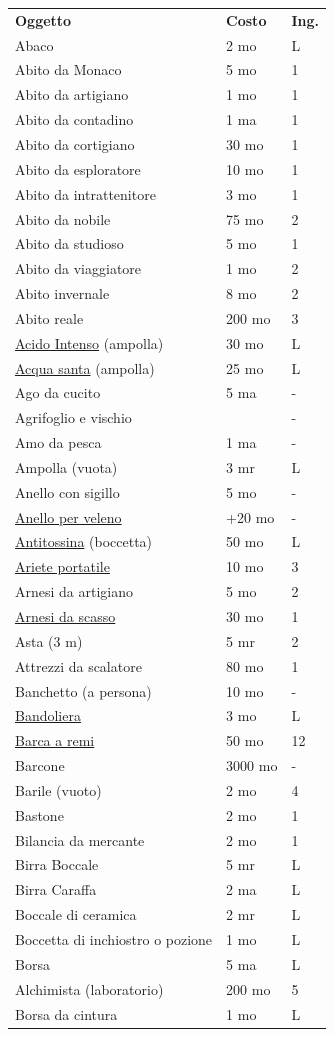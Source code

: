 \begin{multicols}{2}
\noindent\begin{tabularx}{\linewidth}{lll}\label{equipaggiamentolista}
\textbf{Oggetto}& \textbf{Costo} & \textbf{Ing.}\\
Abaco&2 mo&L\\
Abito da Monaco & 5 mo& 1\\
Abito da artigiano& 1 mo& 1\\
Abito da contadino& 1 ma& 1\\
Abito da cortigiano& 30 mo& 1\\
Abito da esploratore& 10 mo& 1\\
Abito da intrattenitore & 3 mo& 1\\
Abito da nobile & 75 mo& 2\\
Abito da studioso & 5 mo& 1\\
Abito da viaggiatore& 1 mo& 2\\
Abito invernale & 8 mo& 2\\
Abito reale & 200 mo & 3\\
\hyperlink{Acido Intenso}{Acido Intenso} (ampolla) & 30 mo& L \\
\hyperlink{Acqua santa}{Acqua santa} (ampolla) & 25 mo& L\\
Ago da cucito & 5 ma &- \\
Agrifoglio e vischio & & -\\
Amo da pesca & 1 ma & - \\
Ampolla (vuota) & 3 mr & L \\
Anello con sigillo& 5 mo& - \\
\hyperlink{Anello per veleno}{Anello per veleno} & +20 mo&-\\
\hyperlink{Antitossina}{Antitossina} (boccetta)& 50 mo& L\\
\hyperlink{Ariete portatile}{Ariete portatile}& 10 mo& 3 \\
Arnesi da artigiano& 5 mo& 2\\
\hyperlink{Attrezzi da scasso}{Arnesi da scasso}& 30 mo& 1\\
Asta (3 m)& 5 mr& 2\\
Attrezzi da scalatore & 80 mo& 1\\
Banchetto (a persona) & 10 mo& -\\
\hyperlink{Bandoliera}{Bandoliera} & 3 mo & L\\
\hyperlink{Barca a remi}{Barca a remi}& 50 mo& 12\\
Barcone & 3000 mo& -\\
Barile (vuoto)& 2 mo& 4\\
Bastone & 2 mo& 1\\
Bilancia da mercante& 2 mo& 1\\
Birra Boccale& 5 mr& L\\
Birra Caraffa & 2 ma & L\\
Boccale di ceramica & 2 mr & L \\
Boccetta di inchiostro o pozione & 1 mo & L\\
Borsa & 5 ma & L \\
Alchimista (laboratorio) & 200 mo & 5 \\
Borsa da cintura & 1 mo & L \\
\end{tabularx}


\end{multicols}
